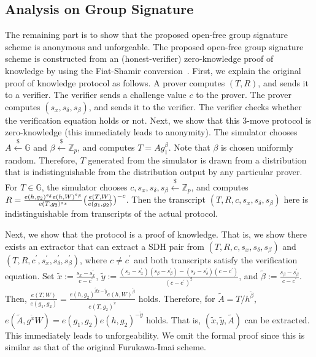 \documentclass[preprint]{sig-alternate}
\begin{document}
\subsection{Analysis on Group Signature}

The remaining part is to show that the proposed open-free group signature scheme is anonymous and unforgeable. 
The proposed open-free group signature scheme is constructed from an (honest-verifier) zero-knowledge proof of knowledge 
by using the Fiat-Shamir conversion~\cite{[FiatS86]}. First, we explain the original proof of knowledge protocol as follows. 
A prover computes $(T,R)$, and sends it to a verifier. The verifier sends a challenge value $c$ to the prover. 
The prover computes $(s_x,s_\delta,s_\beta)$, and sends it to the verifier. The verifier checks whether the verification equation 
holds or not. 
Next, we show that this 3-move protocol is zero-knowledge (this immediately leads to anonymity). 
The simulator chooses $A\stackrel{\$}{\leftarrow}\mathbb{G}$ and $\beta\stackrel{\$}{\leftarrow}\mathbb{Z}_p$, and computes $T=A g_1^\beta$. 
Note that $\beta$ is chosen uniformly random. Therefore, $T$ generated from the simulator is drawn from a distribution that is indistinguishable from the distribution output by any particular prover. 
For $T\in\mathbb{G}$, the simulator chooses $c,s_x,s_\delta,s_\beta\stackrel{\$}{\leftarrow}\mathbb{Z}_p$, and computes $R=\frac{e(h,g_2)^{s_\delta}e(h,W)^{s_\beta}}{e(T,g_2)^{s_x}}\big{(}\frac{e(T,W)}{e(g_1,g_2)}\big{)}^{-c}$. Then the transcript $(T,R,c,\allowbreak s_x,s_\delta,s_\beta)$ here is indistinguishable from transcripts of the actual protocol. 

Next, we show that the protocol is a proof of knowledge. That is, we show there exists an extractor that can extract a SDH pair from $(T,R,c,s_x,s_\delta,s_\beta)$ and $(T,R,c^\prime,s^\prime_x,s^\prime_\delta,s^\prime_\beta)$, where $c\neq c^\prime$ and both transcripts satisfy the verification equation. 
Set $\tilde{x}:=\frac{s_x-s^\prime_x}{c-c^\prime}$, $\tilde{y}:=\frac{(s_x-s^\prime_x)(s_\beta-s^\prime_\beta)-(s_\delta-s^\prime_\delta)(c-c^\prime)}{(c-c^\prime)^2}$, and $\tilde{\beta}:=\frac{s_\beta-s^\prime_\beta}{c-c^\prime}$. 
Then, $\frac{e(T,W)}{e(g_1,g_2)}=\frac{e(h,g_2)^{\tilde{\beta}\tilde{x}-\tilde{y}}e(h,W)^{\tilde{\beta}}}{e(T,g_2)^{\tilde{x}}}$ holds. Therefore, for $\tilde{A}=T/h^{\tilde{\beta}}$, $e(\tilde{A},g^{\tilde{x}}W)=e(g_1,g_2)e(h,g_2)^{-\tilde{y}}$ holds. That is, $(\tilde{x},\tilde{y},\tilde{A})$ can be extracted. 
This immediately leads to unforgeability. 
We omit the formal proof since this is similar as that of the original Furukawa-Imai scheme.
\end{document}
